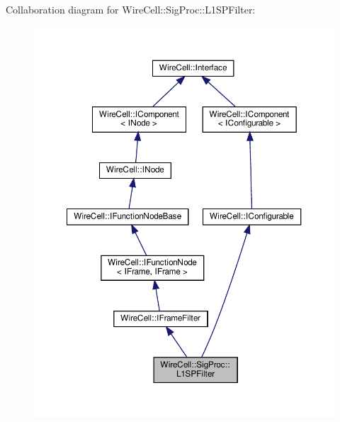 Collaboration diagram for Wire\+Cell\+:\+:Sig\+Proc\+:\+:L1\+S\+P\+Filter\+:
\nopagebreak
\begin{figure}[H]
\begin{center}
\leavevmode
\includegraphics[width=350pt]{class_wire_cell_1_1_sig_proc_1_1_l1_s_p_filter__coll__graph}
\end{center}
\end{figure}
